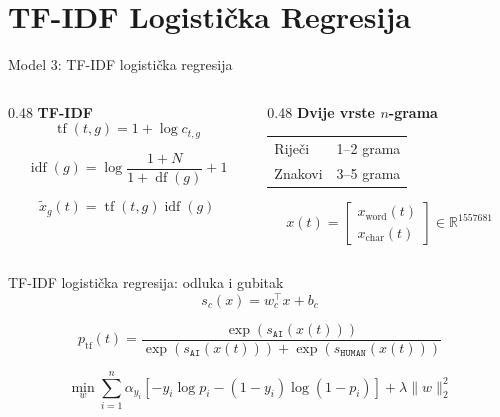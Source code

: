 \documentclass[aspectratio=169]{beamer}
\begin{document}
\section{TF-IDF Logistička Regresija}

\begin{frame}{Model 3: TF-IDF logistička regresija}
    \begin{columns}[T]
        \begin{column}{0.48\textwidth}
            \textbf{TF-IDF}
            \[
                \operatorname{tf}(t,g)=1+\log c_{t,g}
            \]

            \[
                \operatorname{idf}(g)=\log\frac{1+N}{1+\operatorname{df}(g)}+1
            \]

            \[
                \tilde x_g(t)=\operatorname{tf}(t,g)\operatorname{idf}(g)
            \]
        \end{column}
        \begin{column}{0.48\textwidth}
            \textbf{Dvije vrste $n$-grama}
            \begin{tabular}{@{}ll@{}}
                \toprule
                Riječi & 1--2 grama \\
                Znakovi & 3--5 grama \\
                \bottomrule
            \end{tabular}

            \vspace{3mm}
            \[
                x(t)=\begin{bmatrix}x_{\mathrm{word}}(t)\\x_{\mathrm{char}}(t)\end{bmatrix}\in\mathbb{R}^{1557681}
            \]
        \end{column}
    \end{columns}
\end{frame}

\begin{frame}{TF-IDF logistička regresija: odluka i gubitak}
    \centering
    \[
        s_c(x)=w_c^\top x+b_c
    \]

    \[
        p_{\mathrm{tf}}(t)=\frac{\exp(s_{\texttt{AI}}(x(t)))}
        {\exp(s_{\texttt{AI}}(x(t)))+\exp(s_{\texttt{HUMAN}}(x(t)))}
    \]

    \[
        \min_w
        \sum_{i=1}^{n}\alpha_{y_i}\left[-y_i\log p_i-(1-y_i)\log(1-p_i)\right]
        +\lambda\|w\|_2^2
    \]
\end{frame}
\end{document}
